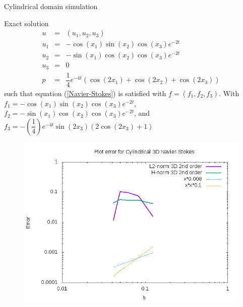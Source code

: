 \documentclass{beamer}
\begin{document}
\begin{frame}{Cylindrical domain simulation}
\begin{block}{Exact solution}
		\begin{eqnarray}\nonumber
		u &=& (u_{1},u_{2},u_{3}) \\ \nonumber
		u_{1} &=& -\cos(x_{1}) \sin(x_{2}) \cos(x_3) e^{-2t}\\ \nonumber
		u_{2} &=& -\sin(x_{1}) \cos(x_{2}) \cos(x_3) e^{-2t}\\ \nonumber
		u_{3} &=& 0 \\ \nonumber
		p&=& \dfrac{1}{4} e^{-4t} (\cos(2x_1)+\cos(2x_2)+\cos(2x_3))
		\end{eqnarray}
		such that equation (\ref{Navier-Stokes}) is satisfied with $ f = (f_{1},f_{2},f_3) $. With $ f_{1} = -\cos(x_1) \sin(x_2) \cos(x_3) e^{-2t} $, $ f_{2} = -\sin(x_1) \cos(x_2) \cos(x_3) e^{-2t}  $, and $ f_{3} = -(\dfrac{1}{4})e^{-4t}\sin(2x_3)(2\cos(2x_3)+1)   $
\end{block}
\end{frame}

\begin{frame}
\begin{figure}
	\centering
	\includegraphics[width=1\linewidth]{NS_3D/error_cyl}
	\caption{}
	\label{fig:errorcyl}
\end{figure}
\end{frame}
\end{document}
